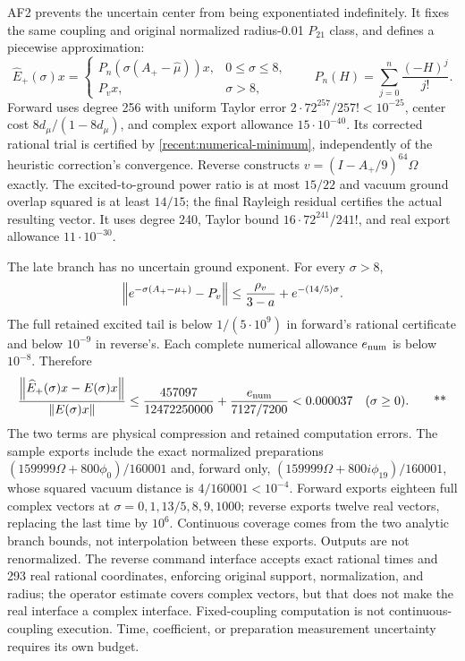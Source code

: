 AF2 prevents the uncertain center from being exponentiated indefinitely.
It fixes the same coupling and original normalized radius-0.01 $P_{21}$ class,
and defines a piecewise approximation:
\begin{equation}
 \widehat E_+(\sigma)x=
 \begin{cases}
  P_n(\sigma(A_+-\widehat\mu))x,&0\le\sigma\le8,\\
  P_vx,&\sigma>8,
 \end{cases}
 \qquad P_n(H)=\sum_{j=0}^n\frac{(-H)^j}{j!}.
 \label{recent:piecewise-solver}
\end{equation}
Forward uses degree 256 with uniform Taylor error
$2\cdot72^{257}/257!<10^{-25}$, center cost
$8d_\mu/(1-8d_\mu)$, and complex export allowance $15\cdot10^{-40}$.
Its corrected rational trial is certified by \eqref{recent:numerical-minimum},
independently of the heuristic correction's convergence.  Reverse constructs
$v=(I-A_+/9)^{64}\Omega$ exactly.  The excited-to-ground power ratio is at most
$15/22$ and vacuum ground overlap squared is at least $14/15$; the final
Rayleigh residual certifies the actual resulting vector.  It uses degree 240,
Taylor bound $16\cdot72^{241}/241!$, and real export allowance
$11\cdot10^{-30}$.

The late branch has no uncertain ground exponent.  For every $\sigma>8$,
\begin{equation}
 \left\lVert e^{-\sigma(A_+-\mu_+)}-P_v\right\rVert
 \le\frac{\rho_v}{3-a}+e^{-(14/5)\sigma}.
 \label{recent:late-solver}
\end{equation}
The full retained excited tail is below $1/(5\cdot10^9)$ in forward's rational
certificate and below $10^{-9}$ in reverse's.  Each complete numerical
allowance $e_{\rm num}$ is below $10^{-8}$.  Therefore
\begin{equation}
 \frac{\left\lVert \widehat E_+(\sigma)x-E(\sigma)x\right\rVert}{\left\lVert E(\sigma)x\right\rVert}
 \le\frac{457097}{12472250000}
   +\frac{e_{\rm num}}{7127/7200}<0.000037
 \quad(\sigma\ge0).\qquad\text{**}
 \label{recent:computed-relative}
\end{equation}
The two terms are physical compression and retained computation errors.
The sample exports include the exact normalized preparations
$(159999\Omega+800\phi_0)/160001$ and, forward only,
$(159999\Omega+800i\phi_{19})/160001$, whose squared vacuum distance is
$4/160001<10^{-4}$.  Forward exports eighteen full complex vectors at
$\sigma=0,1,13/5,8,9,1000$; reverse exports twelve real vectors, replacing the
last time by $10^6$.  Continuous coverage comes from the two analytic branch
bounds, not interpolation between these exports.  Outputs are not renormalized.
The reverse command interface accepts exact rational times and 293 real rational
coordinates, enforcing original support, normalization, and radius; the operator
estimate covers complex vectors, but that does not make the real interface a
complex interface.  Fixed-coupling computation is not continuous-coupling
execution.  Time, coefficient, or preparation measurement uncertainty requires
its own budget.

